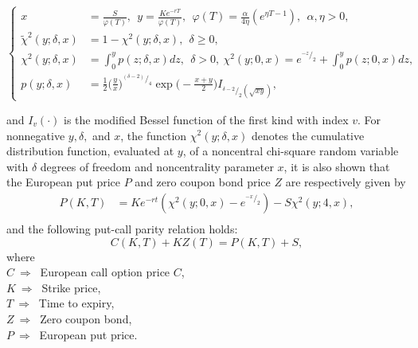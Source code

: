 \documentclass[a4 paper, 12pt]{report}
\newcommand*\rfrac[2]{{}^{#1}\!/_{#2}}
\theoremstyle{plain}
\begin{document}
\begin{equation}\label{neww3}
\left\{
\begin{split}
x& = \frac{S}{\varphi(T)},~~y = \frac{Ke^{-rT}}{\varphi(T)},~~\varphi(T) = \frac{\alpha}{4\eta}(e^{\eta T - 1}),~~\alpha,\eta>0,\\
\tilde{\chi}^2(y;\delta,x)& = 1-\chi^2(y;\delta,x),~~\delta\geq 0,\\
\chi^2(y;\delta,x) & = \int_0^yp(z;\delta,x)dz,~~\delta>0,~\chi^2(y;0,x) = e^{\rfrac{-z}{2}}+\int_0^yp(z;0,x)dz,\\
p(y;\delta,x) & = \frac{1}{2}\bigg(\frac{y}{x}\bigg)^{\rfrac{(\delta-2)}{4}}\exp\bigg(-\frac{x+y}{2}\bigg)I_{\rfrac{\delta-2}{2}(\sqrt{xy})},
\end{split}
\right.
\end{equation}

and $I_v(\cdot)$ is the modified Bessel function of the first kind with index $v$. For nonnegative $y,\delta,$ and $x$, the function $\chi^2(y; \delta, x)$ denotes the cumulative
distribution function, evaluated at $y$, of a noncentral chi-square random variable with $\delta$ degrees of freedom and noncentrality parameter $x$, it is also shown that the European put price $P$ and zero coupon bond price $Z$ are respectively given by
\begin{align}
P(K,T)& = Ke^{-rt}(\chi^2(y;0,x) - e^{\rfrac{-x}{2}}) - S\chi^2(y;4,x),\label{neww4}\\
\end{align}
and the following put-call parity relation holds:
\begin{equation}\label{neww6}
C(K,T)+KZ(T) = P(K,T)+S,
\end{equation}
where\\
$C~\Rightarrow~ $ European call option price $C$,\\
$K~\Rightarrow~ $ Strike price,\\
$T~\Rightarrow~ $ Time to expiry,\\
$Z~\Rightarrow~ $ Zero coupon bond,\\
$P~\Rightarrow~ $ European put price.
\end{document}

